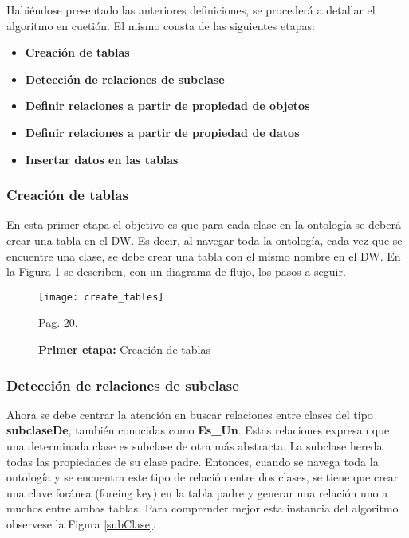 \documentclass[a4paper,11pt]{article}
\begin{document}
\begin{flushleft}
    
    Habiéndose presentado las anteriores definiciones, se procederá a detallar el algoritmo en cuetión. El mismo consta de las siguientes etapas:
    
    \begin{itemize}
      \item \textbf{Creación de tablas}
      \item \textbf{Detección de relaciones de subclase}
      \item \textbf{Definir relaciones a partir de propiedad de objetos}
      \item \textbf{Definir relaciones a partir de propiedad de datos}
      \item \textbf{Insertar datos en las tablas}
    \end{itemize} 
    
    \subsubsection{Creación de tablas}
    
    En esta primer etapa el objetivo es que para cada clase en la ontología se deberá crear una tabla en el DW. Es decir, al navegar toda la ontología,
    cada vez que se encuentre una clase, se debe crear una tabla con el mismo nombre en el DW. En la Figura \ref{createTables} se describen, con un
    diagrama de flujo, los pasos a seguir.
    
    \begin{figure}
      \begin{center}
        \texttt{[image: create\_tables]}
        \caption{\textbf{Primer etapa:} Creación de tablas} \cite{ontologias} Pag. 20.
        \label{createTables}
      \end{center}
    \end{figure}
    
    \subsubsection{Detección de relaciones de subclase}
     
    Ahora se debe centrar la atención en buscar relaciones entre clases del tipo \textbf{subclaseDe}, también conocidas como \textbf{Es\_Un}. Estas
    relaciones expresan que una determinada clase es subclase de otra más abstracta. La subclase hereda todas las propiedades de su clase padre.
    Entonces, cuando se navega toda la ontología y se encuentra este tipo de relación entre dos clases, se tiene que crear una clave foránea (foreing
    key) en la tabla padre y generar una relación uno a muchos entre ambas tablas. Para comprender mejor esta instancia del algoritmo observese la
    Figura \ref{subClase}.
   

\end{flushleft}
\end{document}
